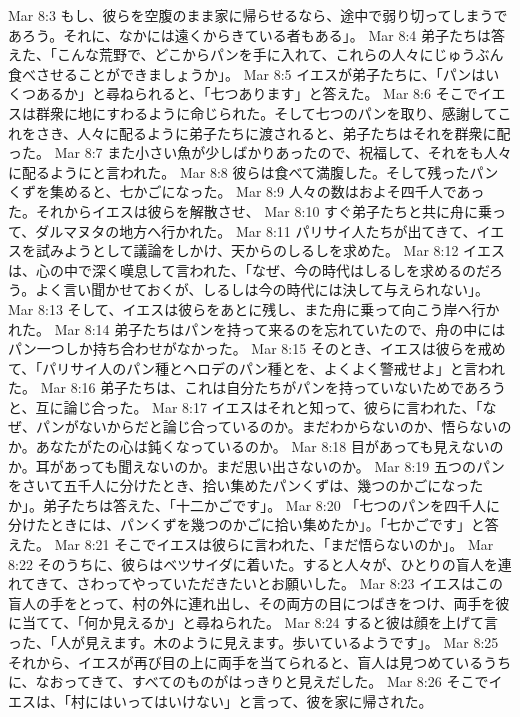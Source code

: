 Mar 8:3  もし、彼らを空腹のまま家に帰らせるなら、途中で弱り切ってしまうであろう。それに、なかには遠くからきている者もある」。
Mar 8:4  弟子たちは答えた、「こんな荒野で、どこからパンを手に入れて、これらの人々にじゅうぶん食べさせることができましょうか」。
Mar 8:5  イエスが弟子たちに、「パンはいくつあるか」と尋ねられると、「七つあります」と答えた。
Mar 8:6  そこでイエスは群衆に地にすわるように命じられた。そして七つのパンを取り、感謝してこれをさき、人々に配るように弟子たちに渡されると、弟子たちはそれを群衆に配った。
Mar 8:7  また小さい魚が少しばかりあったので、祝福して、それをも人々に配るようにと言われた。
Mar 8:8  彼らは食べて満腹した。そして残ったパンくずを集めると、七かごになった。
Mar 8:9  人々の数はおよそ四千人であった。それからイエスは彼らを解散させ、
Mar 8:10  すぐ弟子たちと共に舟に乗って、ダルマヌタの地方へ行かれた。
Mar 8:11  パリサイ人たちが出てきて、イエスを試みようとして議論をしかけ、天からのしるしを求めた。
Mar 8:12  イエスは、心の中で深く嘆息して言われた、「なぜ、今の時代はしるしを求めるのだろう。よく言い聞かせておくが、しるしは今の時代には決して与えられない」。
Mar 8:13  そして、イエスは彼らをあとに残し、また舟に乗って向こう岸へ行かれた。
Mar 8:14  弟子たちはパンを持って来るのを忘れていたので、舟の中にはパン一つしか持ち合わせがなかった。
Mar 8:15  そのとき、イエスは彼らを戒めて、「パリサイ人のパン種とヘロデのパン種とを、よくよく警戒せよ」と言われた。
Mar 8:16  弟子たちは、これは自分たちがパンを持っていないためであろうと、互に論じ合った。
Mar 8:17  イエスはそれと知って、彼らに言われた、「なぜ、パンがないからだと論じ合っているのか。まだわからないのか、悟らないのか。あなたがたの心は鈍くなっているのか。
Mar 8:18  目があっても見えないのか。耳があっても聞えないのか。まだ思い出さないのか。
Mar 8:19  五つのパンをさいて五千人に分けたとき、拾い集めたパンくずは、幾つのかごになったか」。弟子たちは答えた、「十二かごです」。
Mar 8:20  「七つのパンを四千人に分けたときには、パンくずを幾つのかごに拾い集めたか」。「七かごです」と答えた。
Mar 8:21  そこでイエスは彼らに言われた、「まだ悟らないのか」。
Mar 8:22  そのうちに、彼らはベツサイダに着いた。すると人々が、ひとりの盲人を連れてきて、さわってやっていただきたいとお願いした。
Mar 8:23  イエスはこの盲人の手をとって、村の外に連れ出し、その両方の目につばきをつけ、両手を彼に当てて、「何か見えるか」と尋ねられた。
Mar 8:24  すると彼は顔を上げて言った、「人が見えます。木のように見えます。歩いているようです」。
Mar 8:25  それから、イエスが再び目の上に両手を当てられると、盲人は見つめているうちに、なおってきて、すべてのものがはっきりと見えだした。
Mar 8:26  そこでイエスは、「村にはいってはいけない」と言って、彼を家に帰された。
